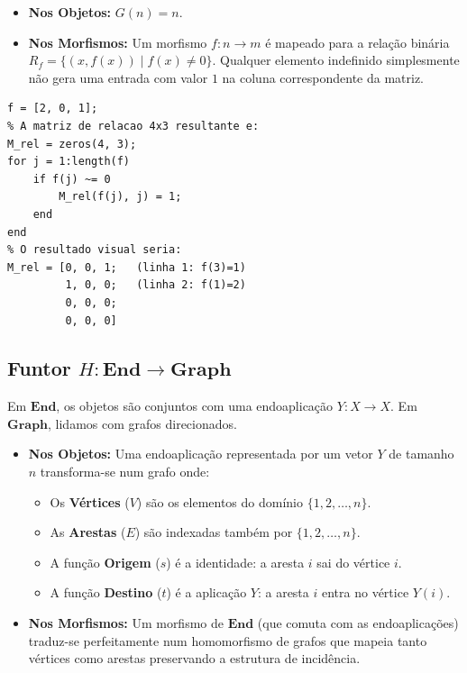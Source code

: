 \documentclass[11pt,a4paper]{article}
\begin{document}
\begin{itemize}
    \item \textbf{Nos Objetos:} $G(n) = n$.
    \item \textbf{Nos Morfismos:} Um morfismo $f: n \to m$ é mapeado para a relação binária $R_f = \{(x, f(x)) \mid f(x) \neq 0\}$. Qualquer elemento indefinido simplesmente não gera uma entrada com valor $1$ na coluna correspondente da matriz.
\end{itemize}

\begin{lstlisting}[caption={Exemplo de Par para Rel em MATLAB}]
% f: 3 -> 4, onde f(2) e indefinido
f = [2, 0, 1]; 
% A matriz de relacao 4x3 resultante e:
M_rel = zeros(4, 3);
for j = 1:length(f)
    if f(j) ~= 0
        M_rel(f(j), j) = 1;
    end
end
% O resultado visual seria:
M_rel = [0, 0, 1;   (linha 1: f(3)=1)
         1, 0, 0;   (linha 2: f(1)=2)
         0, 0, 0; 
         0, 0, 0]
\end{lstlisting}

\subsection{Funtor $H: \mathbf{End} \to \mathbf{Graph}$}

Em $\mathbf{End}$, os objetos são conjuntos com uma endoaplicação $Y: X \to X$. Em $\mathbf{Graph}$, lidamos com grafos direcionados.

\begin{itemize}
    \item \textbf{Nos Objetos:} Uma endoaplicação representada por um vetor $Y$ de tamanho $n$ transforma-se num grafo onde:
    \begin{itemize}
        \item Os \textbf{Vértices} ($V$) são os elementos do domínio $\{1, 2, \dots, n\}$.
        \item As \textbf{Arestas} ($E$) são indexadas também por $\{1, 2, \dots, n\}$.
        \item A função \textbf{Origem} ($s$) é a identidade: a aresta $i$ sai do vértice $i$.
        \item A função \textbf{Destino} ($t$) é a aplicação $Y$: a aresta $i$ entra no vértice $Y(i)$.
    \end{itemize}
    \item \textbf{Nos Morfismos:} Um morfismo de $\mathbf{End}$ (que comuta com as endoaplicações) traduz-se perfeitamente num homomorfismo de grafos que mapeia tanto vértices como arestas preservando a estrutura de incidência.
\end{itemize}
\end{document}
